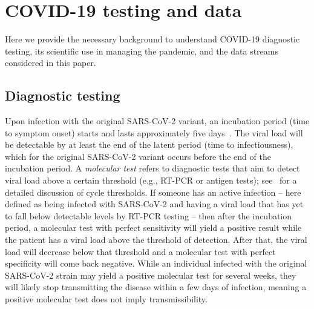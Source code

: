 \documentclass[11pt]{amsart}
\numberwithin{equation}{section}
\theoremstyle{plain}
\begin{document}



 \section{COVID-19 testing and data}
 \label{section:data}

Here we provide the necessary background to understand COVID-19 diagnostic testing, its scientific use in managing the pandemic, and the data streams considered in this paper.

\subsection{Diagnostic testing}
\label{section:testinginfo}

 Upon infection with the original SARS-CoV-2 variant, an incubation period (time to symptom onset) starts and lasts approximately five days~\citep{Lauer2020}.  The viral load will be detectable by at least the end of the latent period (time to infectiousness), which for the original SARS-CoV-2 variant occurs before the end of the incubation period.  A \emph{molecular test} refers to diagnostic tests that aim to detect viral load above a certain threshold (e.g., RT-PCR or antigen tests); see~\cite{Mina2020} for a detailed discussion of cycle thresholds.  If someone has an active infection -- here defined as being infected with SARS-CoV-2 and having a viral load that has yet to fall below detectable levels by RT-PCR testing -- then after the incubation period, a molecular test with perfect sensitivity will yield a positive result while the patient has a viral load above the threshold of detection.  After that, the viral load will decrease below that threshold and a molecular test with perfect specificity will come back negative. While an individual infected with the original SARS-CoV-2 strain may yield a positive molecular test for several weeks, they will likely stop transmitting the disease within a few days of infection, meaning a positive molecular test does not imply transmissibility.
\end{document}
